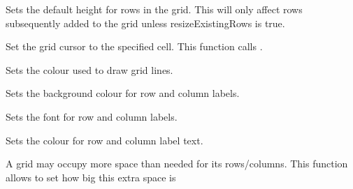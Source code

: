\label{wxgridsetdefaultrowsize}


Sets the default height for rows in the grid. This will only affect rows subsequently added
to the grid unless resizeExistingRows is true.



\label{wxgridsetgridcursor}


Set the grid cursor to the specified cell.
This function calls .



\label{wxgridsetgridlinecolour}


Sets the colour used to draw grid lines.



\label{wxgridsetlabelbackgroundcolour}


Sets the background colour for row and column labels.



\label{wxgridsetlabelfont}


Sets the font for row and column labels.



\label{wxgridsetlabeltextcolour}


Sets the colour for row and column label text.



\label{wxgridsetmargins}


A grid may occupy more space than needed for its rows/columns. This
function allows to set how big this extra space is



